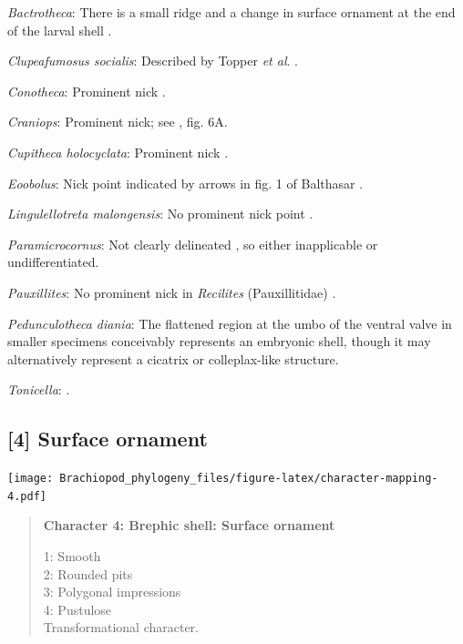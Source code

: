 \documentclass[openany]{book}
\begin{document}
\hypertarget{Bactrotheca-coding-3}{}
\emph{Bactrotheca}: There is a small ridge and a change in surface
ornament at the end of the larval shell \citep{Dzik1980Ontogenyof}.

\hypertarget{Clupeafumosus_socialis-coding-3}{}
\emph{Clupeafumosus socialis}: Described by Topper \emph{et al}.
\citeyearpar{Topper2013Reappraisalof}.

\hypertarget{Conotheca-coding-3}{}
\emph{Conotheca}: Prominent nick \citep[figs 5G-H, 6a1]{Wrona2003}.

\hypertarget{Craniops-coding-3}{}
\emph{Craniops}: Prominent nick; see \citet{Freeman1999Changesin}, fig.
6A.

\hypertarget{Cupitheca_holocyclata-coding-3}{}
\emph{Cupitheca holocyclata}: Prominent nick \citep{Skovsted2016}.

\hypertarget{Eoobolus-coding-3}{}
\emph{Eoobolus}: Nick point indicated by arrows in fig. 1 of Balthasar
\citeyearpar{Balthasar2009Thebrachiopod}.

\hypertarget{Lingulellotreta_malongensis-coding-3}{}
\emph{Lingulellotreta malongensis}: No prominent nick point
\citep{Holmer1997EarlyCambrian, Li2004}.

\hypertarget{Paramicrocornus-coding-3}{}
\emph{Paramicrocornus}: Not clearly delineated
\citep{Zhang2018Ahyolithid}, so either inapplicable or undifferentiated.

\hypertarget{Pauxillites-coding-3}{}
\emph{Pauxillites}: No prominent nick in \emph{Recilites}
(Pauxillitidae) \citep{Dzik1978}.

\hypertarget{Pedunculotheca_diania-coding-3}{}
\emph{Pedunculotheca diania}: The flattened region at the umbo of the
ventral valve in smaller specimens conceivably represents an embryonic
shell, though it may alternatively represent a cicatrix or
colleplax-like structure.

\hypertarget{Tonicella-coding-3}{}
\emph{Tonicella}: \citet{Wanninger2002C}.

\subsection*{{[}4{]} Surface ornament}\label{surface-ornament}

\texttt{[image: Brachiopod\_phylogeny\_files/figure-latex/character-mapping-4.pdf]}

\begin{quote}
\textbf{Character 4: Brephic shell: Surface ornament}

1: Smooth\\
2: Rounded pits\\
3: Polygonal impressions\\
4: Pustulose\\
Transformational character.
\end{quote}
\end{document}
